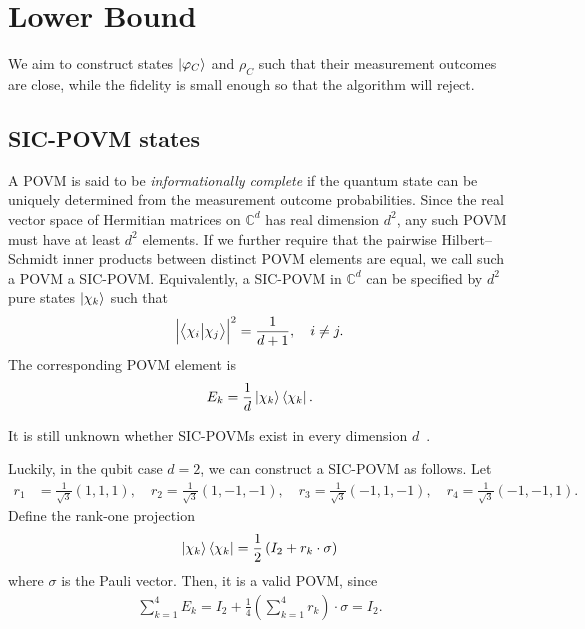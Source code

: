 \section{Lower Bound}
We aim to construct states $\ket{\varphi_C}$ and $\rho_C$ such that their measurement outcomes are close, while the fidelity is small enough so that the algorithm will reject.

\subsection{SIC-POVM states}
A POVM is said to be \textit{informationally complete} if the quantum state can be uniquely determined from the measurement outcome probabilities.
Since the real vector space of Hermitian matrices on $\mathbb{C}^d$ has real dimension $d^2$, any such POVM must have at least $d^2$ elements.
If we further require that the pairwise Hilbert--Schmidt inner products between distinct POVM elements are equal, we call such a POVM a SIC-POVM.
Equivalently, a SIC-POVM in $\mathbb{C}^d$ can be specified by $d^2$ pure states $\ket{\chi_{k}}$ such that 
\begin{align}\label{eq_202606101020}
\left|\bra{\chi_{i}}\ket{\chi_j}\right|^2=\frac{1}{d+1},\quad i\neq j.
\end{align}
The corresponding POVM element is
\begin{align}\label{eq_202606101437}
E_k=\frac{1}{d}\ket{\chi_k}\bra{\chi_k}.
\end{align}
\begin{remark}
It is still unknown whether SIC-POVMs exist in every dimension $d$~\cite{10.1063/1.1737053}.
\end{remark}
Luckily, in the qubit case $d=2$, we can construct a SIC-POVM as follows.
Let
\begin{align*}
r_1&=\frac{1}{\sqrt{3}}(1,1,1),\quad r_2=\frac{1}{\sqrt{3}}(1,-1,-1),\quad r_3=\frac{1}{\sqrt{3}}(-1,1,-1),\quad r_4=\frac{1}{\sqrt{3}}(-1,-1,1).
\end{align*}
Define the rank-one projection
\begin{align}\label{eq_202606101024}
\ket{\chi_k}\bra{\chi_k}=\frac{1}{2}\left(I_2+r_k\cdot\sigma\right)
\end{align}
where $\sigma$ is the Pauli vector.
Then, it is a valid POVM, since
\begin{align*}
\sum_{k=1}^4 E_k=I_2+\frac{1}{4}\left(\sum_{k=1}^4r_k\right)\cdot\sigma=I_2.
\end{align*}

